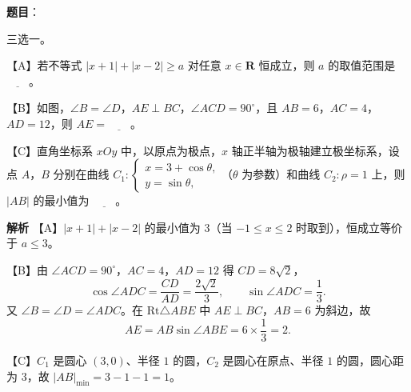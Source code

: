 \begin{answer}

\textbf{题目}：

三选一。

【A】若不等式 $|x+1|+|x-2|\geqslant a$ 对任意 $x\in\mathbf R$ 恒成立，则 $a$ 的取值范围是 $\underline{\qquad}$。

【B】如图，$\angle B=\angle D$，$AE\perp BC$，$\angle ACD=90^\circ$，且 $AB=6$，$AC=4$，$AD=12$，则 $AE=\underline{\qquad}$。
\nopagebreak[4]
\begin{center}\end{center}
\nopagebreak[4]
【C】直角坐标系 $xOy$ 中，以原点为极点，$x$ 轴正半轴为极轴建立极坐标系，设点 $A$，$B$ 分别在曲线 $C_1:\begin{cases}x=3+\cos\theta,\\y=\sin\theta,\end{cases}$（$\theta$ 为参数）和曲线 $C_2:\rho=1$ 上，则 $|AB|$ 的最小值为 $\underline{\qquad}$。

\textbf{解析}
【A】$|x+1|+|x-2|$ 的最小值为 $3$（当 $-1\leqslant x\leqslant2$ 时取到），恒成立等价于 $a\leqslant3$。

【B】由 $\angle ACD=90^\circ$，$AC=4$，$AD=12$ 得 $CD=8\sqrt2$，
\nopagebreak[4]
\[\cos\angle ADC=\frac{CD}{AD}=\frac{2\sqrt2}3,\qquad \sin\angle ADC=\frac13.\]
又 $\angle B=\angle D=\angle ADC$。在 $\mathrm{Rt}\triangle ABE$ 中 $AE\perp BC$，$AB=6$ 为斜边，故
\nopagebreak[4]
\[AE=AB\sin\angle ABE=6\times\frac13=2.\]

【C】$C_1$ 是圆心 $(3,0)$、半径 $1$ 的圆，$C_2$ 是圆心在原点、半径 $1$ 的圆，圆心距为 $3$，故 $|AB|_{\min}=3-1-1=1$。


\end{answer}
